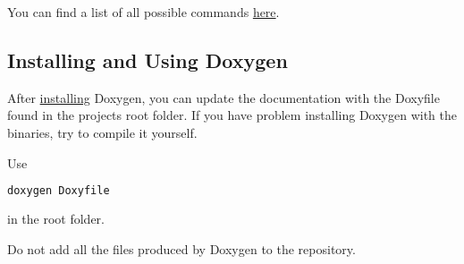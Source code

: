 You can find a list of all possible commands \href{http://www.stack.nl/~dimitri/doxygen/manual/commands.html}{here}.

\subsection{Installing and Using Doxygen}

After \href{http://www.stack.nl/~dimitri/doxygen/download.html}{installing} Doxygen, you can update the documentation with the Doxyfile found in the projects root folder. If you have problem installing Doxygen with the binaries, try to compile it yourself. 

Use
\begin{lstlisting}[language=bash, numbers=none]
	doxygen Doxyfile
\end{lstlisting}
in the root folder.

\begin{mdframed}
Do not add all the files produced by Doxygen to the repository.
\end{mdframed}